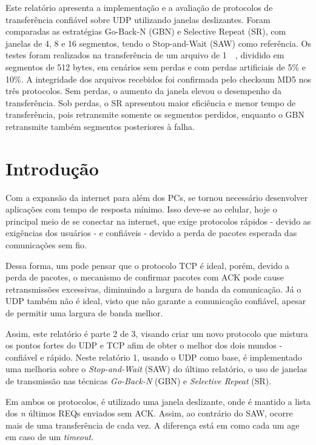 \documentclass[11pt,a4paper]{article}
\begin{document}
\capa

%

\begin{resumo}
Este relatório apresenta a implementação e a avaliação de protocolos de transferência confiável sobre UDP
utilizando janelas deslizantes. Foram comparadas as estratégias Go-Back-N (GBN) e Selective Repeat (SR),
com janelas de 4, 8 e 16 segmentos, tendo o Stop-and-Wait (SAW) como referência. Os testes foram realizados
na transferência de um arquivo de \SI{1}{\mebi\byte}, dividido em segmentos de 512 bytes, em cenários sem
perdas e com perdas artificiais de 5\% e 10\%. A integridade dos arquivos recebidos foi confirmada pelo checksum
MD5 nos três protocolos. Sem perdas, o aumento da janela elevou o desempenho da transferência. Sob perdas, o SR
apresentou maior eficiência e menor tempo de transferência, pois retransmite somente os segmentos perdidos, enquanto
o GBN retransmite também segmentos posteriores à falha.
\end{resumo}

\section{Introdução}

Com a expansão da internet para além dos PCs, se tornou necessário desenvolver aplicações com tempo de resposta mínimo.
Isso deve-se ao celular, hoje o principal meio de se conectar na internet, que exige protocolos rápidos - devido as exigências dos usuários -
e confiáveis - devido a perda de pacotes esperada das comunicações sem fio.

Dessa forma, um pode pensar que o protocolo TCP é ideal, porém, devido a perda de pacotes, o mecanismo de confirmar pacotes com ACK
pode cause retransmissões excessivas, diminuindo a largura de banda da comunicação. Já o UDP também não é ideal, visto que não garante
a comunicação confiável, apesar de permitir uma largura de banda melhor.

Assim, este relatório é parte 2 de 3, visando criar um novo protocolo que mistura os pontos fortes do UDP e TCP afim de obter
o melhor dos dois mundos - confiável e rápido. Neste relatório 1, usando o UDP como base, é implementado uma melhoria sobre o
\textit{Stop-and-Wait} (SAW) do último relatório, o uso de janelas de transmissão nas técnicas \textit{Go-Back-N} (GBN) e \textit{Selective Repeat} (SR).

Em ambos os protocolos, é utilizado uma janela deslizante, onde é mantido a lista dos \textit{n} últimos REQs enviados sem ACK.
Assim, ao contrário do SAW, ocorre mais de uma transferência de cada vez. A diferença está em como cada um age em caso de um \textit{timeout}.
\end{document}

